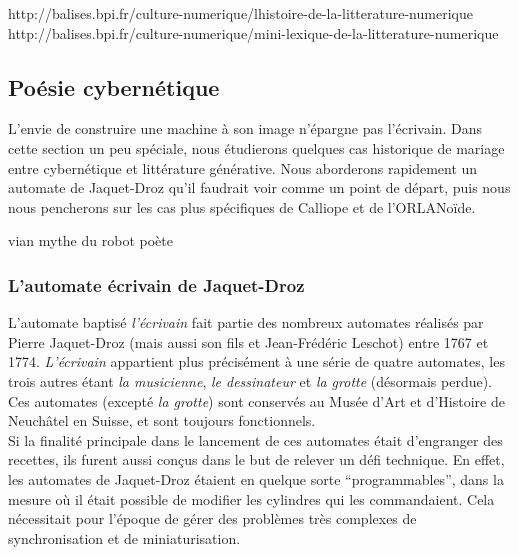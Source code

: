 \documentclass{article}
\begin{document}
			http://balises.bpi.fr/culture-numerique/lhistoire-de-la-litterature-numerique
			http://balises.bpi.fr/culture-numerique/mini-lexique-de-la-litterature-numerique
				
				
			
		\subsection{Poésie cybernétique}
			L'envie de construire une machine à son image n'épargne pas l'écrivain. Dans cette section un peu spéciale, nous étudierons quelques cas historique de mariage entre cybernétique et littérature générative. Nous aborderons rapidement un automate de Jaquet-Droz qu'il faudrait voir comme un point de départ, puis nous nous pencherons sur les cas plus spécifiques de Calliope et de l'ORLANoïde.
			
			
						vian mythe du robot poète
			\subsubsection{L'automate écrivain de Jaquet-Droz}
				L'automate baptisé \textit{l'écrivain} fait partie des nombreux automates réalisés par Pierre Jaquet-Droz (mais aussi son fils et Jean-Frédéric Leschot) entre 1767 et 1774. \textit{L'écrivain} appartient plus précisément à une série de quatre automates, les trois autres étant \textit{la musicienne}, \textit{le dessinateur} et \textit{la grotte} (désormais perdue). Ces automates (excepté \textit{la grotte}) sont conservés au Musée d'Art et d'Histoire de Neuchâtel en Suisse, et sont toujours fonctionnels.\\
				
				Si la finalité principale dans le lancement de ces automates était d'engranger des recettes, ils furent aussi conçus dans le but de relever un défi technique. En effet, les automates de Jaquet-Droz étaient en quelque sorte ``programmables'', dans la mesure où il était possible de modifier les cylindres qui les commandaient. Cela nécessitait pour l'époque de gérer des problèmes très complexes de synchronisation et de miniaturisation.\\
				
\end{document}
